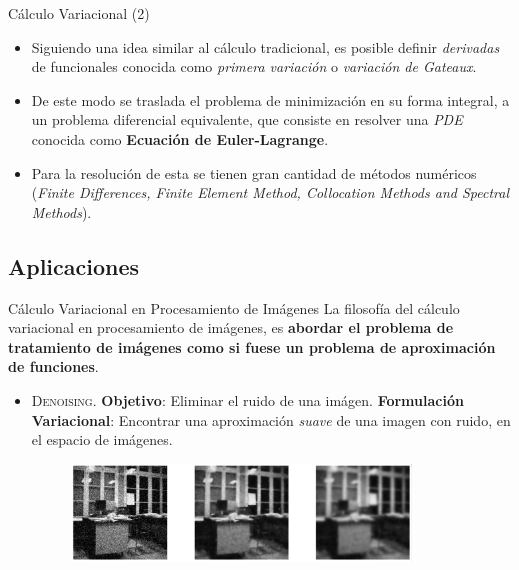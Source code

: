 \documentclass{beamer}
\begin{document}
\begin{frame}{Cálculo Variacional (2)}
\begin{itemize}
  \item Siguiendo una idea similar al cálculo tradicional, es posible definir \textit{derivadas} de funcionales conocida como \textit{primera variación} o \textit{variación de Gateaux}.
  \item De este modo se traslada el problema de minimización en su forma integral, a un problema diferencial equivalente, que consiste en resolver una \textit{PDE} conocida como \textbf{Ecuación de Euler-Lagrange}.
  \item Para la resolución de esta se tienen gran cantidad de métodos numéricos (\textit{Finite Differences, Finite Element Method, Collocation Methods and Spectral Methods}).
\end{itemize}
\end{frame}

\subsection{Aplicaciones}

\begin{frame}{Cálculo Variacional en Procesamiento de Imágenes}
La filosofía del cálculo variacional en procesamiento de imágenes, es \textbf{abordar el problema de tratamiento de imágenes como si fuese un problema de aproximación de funciones}.

\begin{itemize}
  \item \textsc{Denoising}. \textbf{Objetivo}: Eliminar el ruido de una imágen. \textbf{Formulación Variacional}: Encontrar una aproximación \textit{suave} de una imagen con ruido, en el espacio de imágenes.
  \begin{figure}[htpb!]
  \centering
  \includegraphics[width=9cm]{denoising}
  \end{figure}
\end{itemize}
\end{frame}
\end{document}
